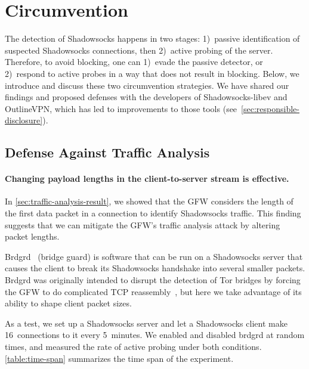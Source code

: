 \documentclass[sigconf,letterpaper]{acmart}
\begin{document}
\section{Circumvention}
\label{sec:circumvention}

The detection of Shadowsocks happens in two stages:
1)~passive identification of suspected Shadowsocks connections, then
2)~active probing of the server.
Therefore, to avoid blocking, one can
1)~evade the passive detector, or
2)~respond to active probes in a way that does not result in blocking.
Below, we introduce and discuss these two circumvention strategies.
We have shared our findings and proposed defenses with the developers of Shadowsocks-libev and OutlineVPN,
which has led to improvements to those tools (see~\autoref{sec:responsible-disclosure}).

\subsection{Defense Against Traffic Analysis}
\label{sec:defense-traffic-analysis}

\paragraph{Changing payload lengths in the client-to-server stream is effective.}

In \autoref{sec:traffic-analysis-result},
we showed that the GFW considers the length of the first data packet in a connection to identify Shadowsocks traffic.
This finding suggests that
we can mitigate the GFW's traffic analysis attack
by altering packet lengths.

Brdgrd~\cite{brdgrd} (bridge guard) is software that can be run on a Shadowsocks server that causes the client to break its Shadowsocks handshake into several smaller packets.
Brdgrd was originally intended to disrupt the detection of Tor bridges by forcing the GFW to do complicated TCP reassembly~\cite{Winter2012a},
but here we take advantage of its ability to shape client packet sizes.

As a test, we set up a Shadowsocks server and let a Shadowsocks client make 16~connections to it every 5~minutes.
We enabled and disabled brdgrd at random times,
and measured the rate of active probing under both conditions.
\autoref{table:time-span} summarizes the time span of the experiment.
\end{document}
